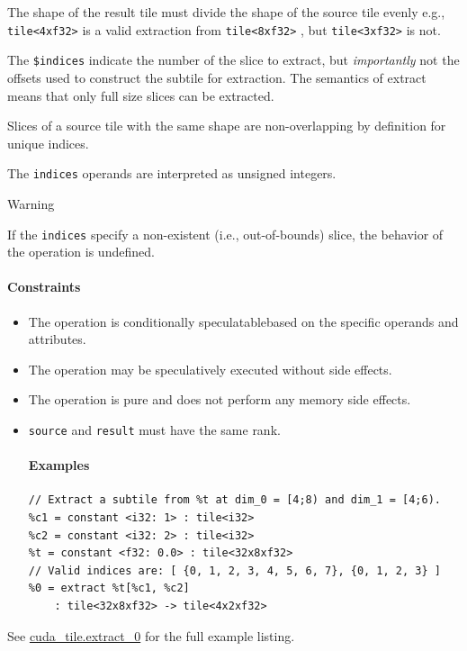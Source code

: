 \documentclass{article}
\begin{document}
The shape of the result tile must divide the shape of the source tile evenly e.g., \texttt{tile<4xf32>} is a valid extraction from \texttt{tile<8xf32>} , but \texttt{tile<3xf32>} is not.


The \texttt{\$indices} indicate the number of the slice to extract, but \textit{importantly} not the offsets used to construct the subtile for extraction. The semantics of extract means that only full size slices can be extracted.


Slices of a source tile with the same shape are non-overlapping by definition for unique indices.


The \texttt{indices} operands are interpreted as unsigned integers.


Warning


If the \texttt{indices} specify a non-existent (i.e., out-of-bounds) slice, the behavior of the operation is undefined.



\paragraph{Constraints}

\begin{itemize}
\item The operation is conditionally speculatablebased on the specific operands and attributes.
\item The operation may be speculatively executed without side effects.
\item The operation is pure and does not perform any memory side effects.
\item \texttt{source} and \texttt{result} must have the same rank.


\paragraph{Examples}

\begin{lstlisting}
// Extract a subtile from %t at dim_0 = [4;8) and dim_1 = [4;6).
%c1 = constant <i32: 1> : tile<i32>
%c2 = constant <i32: 2> : tile<i32>
%t = constant <f32: 0.0> : tile<32x8xf32>
// Valid indices are: [ {0, 1, 2, 3, 4, 5, 6, 7}, {0, 1, 2, 3} ]
%0 = extract %t[%c1, %c2]
    : tile<32x8xf32> -> tile<4x2xf32>
\end{lstlisting}

\end{itemize}
See \href{https://docs.nvidia.com/cuda/tile-ir/latest/sections/appendix.html#example-cuda-tile-extract-0}{cuda\_tile.extract\_0} for the full example listing.
\end{document}
